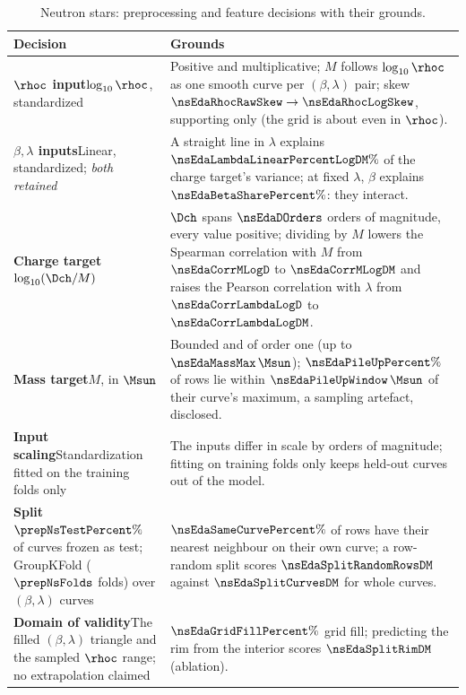 \begin{table}[!htb]
\centering
\caption{Neutron stars: preprocessing and feature decisions with their grounds.}
\label{tab:decisions-ns}
\renewcommand{\arraystretch}{1.2}
\small
\begin{tabular}{p{4.2cm} p{7.4cm}}
\toprule
Decision & Grounds \\
\midrule
\textbf{$\rhoc$ input}\newline $\log_{10}\rhoc$, standardized &
Positive and multiplicative; $M$ follows $\log_{10}\rhoc$ as one smooth curve per $(\beta, \lambda)$ pair; skew $\nsEdaRhocRawSkew \to \nsEdaRhocLogSkew$, supporting only (the grid is about even in $\rhoc$). \\
\textbf{$\beta, \lambda$ inputs}\newline Linear, standardized; \emph{both retained} &
A straight line in $\lambda$ explains $\nsEdaLambdaLinearPercentLogDM\%$ of the charge target's variance; at fixed $\lambda$, $\beta$ explains $\nsEdaBetaSharePercent\%$: they interact. \\
\textbf{Charge target}\newline $\log_{10}(\Dch/M)$ &
$\Dch$ spans $\nsEdaDOrders$ orders of magnitude, every value positive; dividing by $M$ lowers the Spearman correlation with $M$ from $\nsEdaCorrMLogD$ to $\nsEdaCorrMLogDM$ and raises the Pearson correlation with $\lambda$ from $\nsEdaCorrLambdaLogD$ to $\nsEdaCorrLambdaLogDM$. \\
\textbf{Mass target}\newline $M$, in $\Msun$ &
Bounded and of order one (up to $\nsEdaMassMax\,\Msun$); $\nsEdaPileUpPercent\%$ of rows lie within $\nsEdaPileUpWindow\,\Msun$ of their curve's maximum, a sampling artefact, disclosed. \\
\textbf{Input scaling}\newline Standardization fitted on the training folds only &
The inputs differ in scale by orders of magnitude; fitting on training folds only keeps held-out curves out of the model. \\
\textbf{Split}\newline $\prepNsTestPercent\%$ of curves frozen as test; GroupKFold ($\prepNsFolds$ folds) over $(\beta, \lambda)$ curves &
$\nsEdaSameCurvePercent\%$ of rows have their nearest neighbour on their own curve; a row-random split scores $\nsEdaSplitRandomRowsDM$ against $\nsEdaSplitCurvesDM$ for whole curves. \\
\textbf{Domain of validity}\newline The filled $(\beta, \lambda)$ triangle and the sampled $\rhoc$ range; no extrapolation claimed &
$\nsEdaGridFillPercent\%$ grid fill; predicting the rim from the interior scores $\nsEdaSplitRimDM$ (ablation). \\
\bottomrule
\end{tabular}
\end{table}
